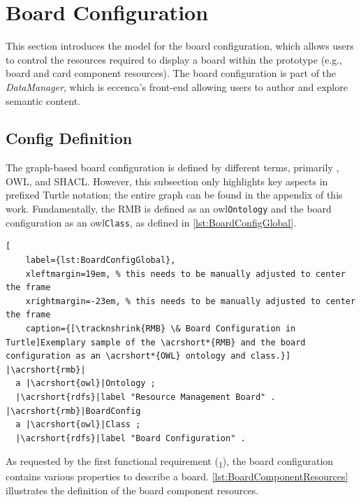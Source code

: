\section{Board Configuration}\label{sec:BoardConfiguration}

This section introduces the model for the board configuration, which allows users to control the resources required to display a board within the prototype (e.g., board and card component resources). The board configuration is part of the \textit{DataManager}, which is eccenca’s front-end allowing users to author and explore semantic content.

\subsection{Config Definition}

The graph-based board configuration is defined by different terms, primarily , \acrshort*{OWL}, and \acrshort*{SHACL}. However, this subsection only highlights key aspects in prefixed Turtle notation; the entire graph can be found in the appendix of this work. Fundamentally, the \acrshort*{RMB} is defined as an \acrshort{owl}\texttt{Ontology} and the board configuration as an \acrshort{owl}\texttt{Class}, as defined in \autoref{lst:BoardConfigGlobal}.

\begin{spacing}{0.9}
    \lstset{language=N3,escapechar=|}
    \begin{lstlisting}[
    label={lst:BoardConfigGlobal},
    xleftmargin=19em, % this needs to be manually adjusted to center the frame
    xrightmargin=-23em, % this needs to be manually adjusted to center the frame
    caption={[\tracknshrink{RMB} \& Board Configuration in Turtle]Exemplary sample of the \acrshort*{RMB} and the board configuration as an \acrshort*{OWL} ontology and class.}]
|\acrshort{rmb}|
  a |\acrshort{owl}|Ontology ;
  |\acrshort{rdfs}|label "Resource Management Board" .
|\acrshort{rmb}|BoardConfig
  a |\acrshort{owl}|Class ;
  |\acrshort{rdfs}|label "Board Configuration" .
\end{lstlisting}
\end{spacing}

\noindent As requested by the first functional requirement (\textsubscript{1}), the board configuration contains various properties to describe a board. \autoref{lst:BoardComponentResources} illustrates the definition of the board component resources.


